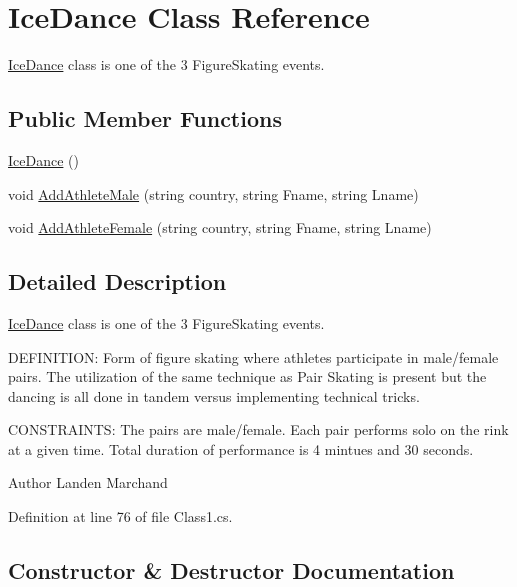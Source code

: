 \hypertarget{classIceDance}{}\section{Ice\+Dance Class Reference}
\label{classIceDance}


\hyperlink{classIceDance}{Ice\+Dance} class is one of the 3 Figure\+Skating events.  


\subsection*{Public Member Functions}
\begin{DoxyCompactItemize}
\item 
\hyperlink{classIceDance_a237069675d6d3af0a9e781d2ae34ebfe}{Ice\+Dance} ()
\item 
void \hyperlink{classIceDance_abaf4f53da183e1bee83a6e2976ce5c95}{Add\+Athlete\+Male} (string country, string Fname, string Lname)
\item 
void \hyperlink{classIceDance_a7b0f52e81042ff7cb39fc8fb3c7e6a13}{Add\+Athlete\+Female} (string country, string Fname, string Lname)
\end{DoxyCompactItemize}


\subsection{Detailed Description}
\hyperlink{classIceDance}{Ice\+Dance} class is one of the 3 Figure\+Skating events. 

D\+E\+F\+I\+N\+I\+T\+I\+ON\+: Form of figure skating where athletes participate in male/female pairs. The utilization of the same technique as Pair Skating is present but the dancing is all done in tandem versus implementing technical tricks.

C\+O\+N\+S\+T\+R\+A\+I\+N\+TS\+: The pairs are male/female. Each pair performs solo on the rink at a given time. Total duration of performance is 4 mintues and 30 seconds.\begin{DoxyAuthor}{Author}
Landen Marchand 
\end{DoxyAuthor}


Definition at line 76 of file Class1.\+cs.



\subsection{Constructor \& Destructor Documentation}
\mbox{\label{classIceDance_a237069675d6d3af0a9e781d2ae34ebfe}} 
